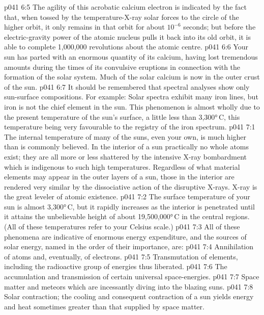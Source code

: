 \vs p041 6:5 The agility of this acrobatic calcium electron is indicated by the fact that, when tossed by the temperature\hyp{}X\hyp{}ray solar forces to the circle of the higher orbit, it only remains in that orbit for about $10^{-6}$ seconds; but before the electric\hyp{}gravity power of the atomic nucleus pulls it back into its old orbit, it is able to complete 1,000,000 revolutions about the atomic centre.
\vs p041 6:6 \pc Your sun has parted with an enormous quantity of its calcium, having lost tremendous amounts during the times of its convulsive eruptions in connection with the formation of the solar system. Much of the solar calcium is now in the outer crust of the sun.
\vs p041 6:7 \pc It should be remembered that spectral analyses show only sun\hyp{}surface compositions. For example: Solar spectra exhibit many iron lines, but iron is not the chief element in the sun. This phenomenon is almost wholly due to the present temperature of the sun’s surface, a little less than 3,300°\,C, this temperature being very favourable to the registry of the iron spectrum.
\vs p041 7:1 The internal temperature of many of the suns, even your own, is much higher than is commonly believed. In the interior of a sun practically no whole atoms exist; they are all more or less shattered by the intensive X\hyp{}ray bombardment which is indigenous to such high temperatures. Regardless of what material elements may appear in the outer layers of a sun, those in the interior are rendered very similar by the dissociative action of the disruptive X\hyp{}rays. X\hyp{}ray is the great leveler of atomic existence.
\vs p041 7:2 The surface temperature of your sun is almost 3,300°\,C, but it rapidly increases as the interior is penetrated until it attains the unbelievable height of about 19,500,000°\,C in the central regions. (All of these temperatures refer to your Celsius scale.)
\vs p041 7:3 \pc All of these phenomena are indicative of enormous energy expenditure, and the sources of solar energy, named in the order of their importance, are:
\vs p041 7:4 \bibnobreakspace Annihilation of atoms and, eventually, of electrons.
\vs p041 7:5 \bibnobreakspace Transmutation of elements, including the radioactive group of energies thus liberated.
\vs p041 7:6 \bibnobreakspace The accumulation and transmission of certain universal space\hyp{}energies.
\vs p041 7:7 \bibnobreakspace Space matter and meteors which are incessantly diving into the blazing suns.
\vs p041 7:8 \bibnobreakspace Solar contraction; the cooling and consequent contraction of a sun yields energy and heat sometimes greater than that supplied by space matter.

